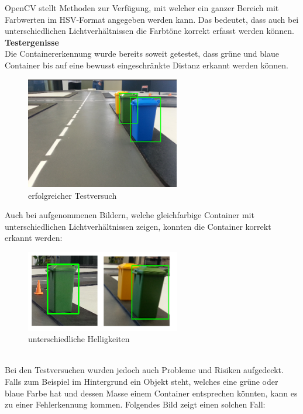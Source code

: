 OpenCV stellt Methoden zur Verfügung, mit welcher ein ganzer Bereich mit Farbwerten im HSV-Format angegeben werden kann. Das bedeutet, dass auch bei unterschiedlichen Lichtverhältnissen die Farbtöne korrekt erfasst werden können.
\\[0.2cm]
\textbf{Testergenisse} \\[0.2cm]
Die Containererkennung wurde bereits soweit getestet, dass grüne und blaue Container bis auf eine bewusst eingeschränkte Distanz erkannt werden können. 
\begin{figure}[H]%
\centering
\includegraphics[width=0.6\textwidth]{03_Loesungskonzept/pictures/containererkennung_blau_gruen.png}
\caption{erfolgreicher Testversuch}
\label{fig:erfolgreicher Testversuch}
\end{figure}
Auch bei aufgenommenen Bildern, welche gleichfarbige Container mit unterschiedlichen Lichtverhältnissen zeigen, konnten die Container korrekt erkannt werden:
\begin{figure}[H]%
\centering
\includegraphics[width=0.6\textwidth]{03_Loesungskonzept/pictures/containererkennung_div_brightness.png}
\caption{unterschiedliche Helligkeiten}
\label{fig:unterschiedliche Helligkeiten}
\end{figure} \\
Bei den Testversuchen wurden jedoch auch Probleme und Risiken aufgedeckt. Falls zum Beispiel im Hintergrund ein Objekt steht, welches eine grüne oder blaue Farbe hat und dessen Masse einem Container entsprechen könnten, kann es zu einer Fehlerkennung kommen. Folgendes Bild zeigt einen solchen Fall:
